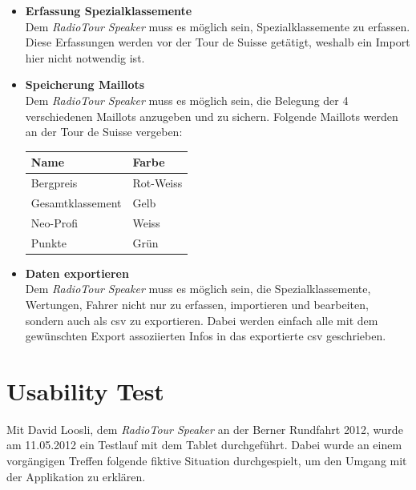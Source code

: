 \begin{itemize}
\item \textbf{Erfassung Spezialklassemente}\\
Dem \textit{RadioTour Speaker} muss es möglich sein, Spezialklassemente zu erfassen. Diese Erfassungen werden vor der Tour de Suisse getätigt, weshalb ein Import hier nicht notwendig ist.

\item \textbf{Speicherung Maillots}\\
Dem \textit{RadioTour Speaker} muss es möglich sein, die Belegung der 4 verschiedenen Maillots anzugeben und zu sichern. Folgende Maillots werden an der Tour de Suisse vergeben:

\begin{center}
  \begin{tabular}{ l | l  }
    \hline
    Name & Farbe \\ \hline
    \hline
    Bergpreis & Rot-Weiss \\ \hline
    Gesamtklassement & Gelb \\ \hline
    Neo-Profi & Weiss \\ \hline
    Punkte & Grün\\

    \hline
  \end{tabular}
\end{center}


\item \textbf{Daten exportieren}\\
Dem \textit{RadioTour Speaker} muss es möglich sein, die Spezialklassemente, Wertungen, Fahrer nicht nur zu erfassen, importieren und bearbeiten, sondern auch als \gls{csv} zu exportieren. Dabei werden einfach alle mit dem gewünschten Export assoziierten Infos in das exportierte \gls{csv} geschrieben.

\end{itemize}

\section{Usability Test}
\label{ref:usability}
Mit David Loosli, dem \textit{RadioTour Speaker} an der Berner Rundfahrt 2012, wurde am 11.05.2012 ein Testlauf mit dem Tablet durchgeführt. Dabei wurde an einem vorgängigen Treffen folgende fiktive Situation durchgespielt, um den Umgang mit der Applikation zu erklären.


